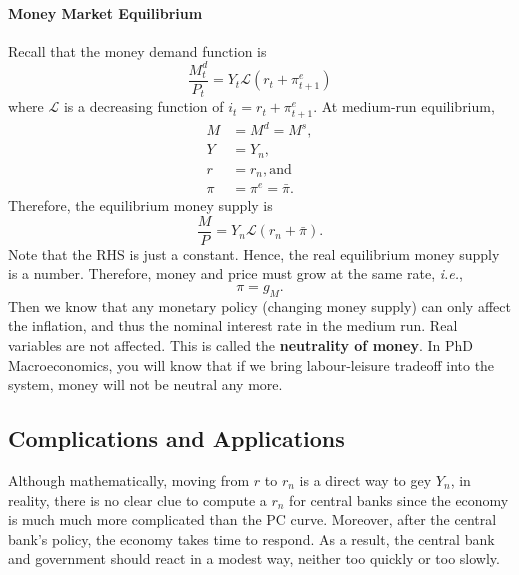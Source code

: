 \documentclass[12pt]{article}
\begin{document}
\paragraph{Money Market Equilibrium}
Recall that the money demand function is
\[\frac{M^d_t}{P_t} = Y_t \mathcal{L}(r_t+\pi^e_{t+1})\]
where $\mathcal{L}$ is a decreasing function of $i_t = r_t + \pi^e_{t+1}$.
At medium-run equilibrium,
\begin{align*}
    M &= M^d = M^s,\\
    Y &= Y_n,\\
    r &= r_n, \text{and }\\
    \pi&= \pi^e = \bar{\pi}.
\end{align*}
Therefore, the equilibrium money supply is
\[\frac{M}{P} = Y_n \mathcal{L}(r_n + \bar{\pi}).\]
Note that the RHS is just a constant. Hence, the real equilibrium money supply is a number. Therefore, money and price must grow at the same rate, \textit{i.e.},
\[\pi = g_M.\]
Then we know that any monetary policy (changing money supply) can only affect the inflation, and thus the nominal interest rate in the medium run. Real variables are not affected. This is called the \textbf{neutrality of money}. In PhD Macroeconomics, you will know that if we bring labour-leisure tradeoff into the system, money will not be neutral any more.

\subsection*{Complications and Applications}
Although mathematically, moving from $r$ to $r_n$ is a direct way to gey $Y_n$, in reality, there is no clear clue to compute a $r_n$ for central banks since the economy is much much more complicated than the PC curve. Moreover, after the central bank's policy, the economy takes time to respond. As a result, the central bank and government should react in a modest way, neither too quickly or too slowly.
\end{document}
